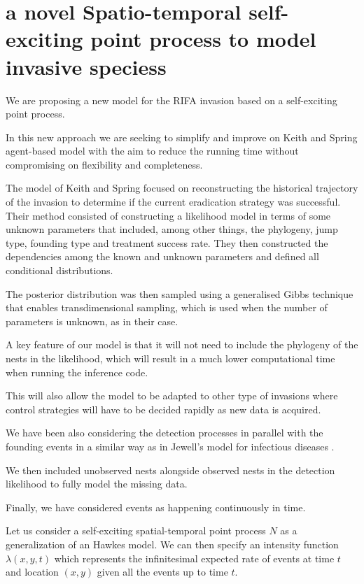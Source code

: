 \chapter[A novel Spatio-temporal self-exciting point process to model invasive species]{a novel Spatio-temporal self-exciting point process to model invasive speciess}
\label{ch:Model}

We are proposing a new model for the RIFA invasion based on a self-exciting point process.

In this new approach we are seeking to simplify and improve on Keith and Spring agent-based model \cite{Keith} with the aim to reduce the running time without compromising on flexibility and completeness.

The model of Keith and Spring focused on reconstructing the historical trajectory of the invasion to determine if the current eradication strategy was successful. Their method consisted of constructing a likelihood model in terms of some unknown parameters that included, among other things, the phylogeny, jump type, founding type and treatment success rate. They then constructed the dependencies among the known and unknown parameters and defined all conditional distributions.

The posterior distribution was then sampled using a generalised Gibbs technique that enables transdimensional sampling, which is used when the number of parameters is unknown, as in their case.

A key feature of our model is that it will not need to include the phylogeny of the nests in the likelihood, which will result in a much lower computational time when running the inference code.

This will also allow the model to be adapted to other type of invasions where control strategies will have to be decided rapidly as new data is acquired.

We have been also considering the detection processes in parallel with the founding events in a similar way as in Jewell's model for infectious diseases \cite{Jewell}.

We then included unobserved nests alongside observed nests in the detection likelihood to fully model the missing data.

Finally, we have considered events as happening continuously in time.

Let us consider a self-exciting spatial-temporal point process $N$ as a generalization of an Hawkes model. We can then specify an intensity function $\lambda(x, y, t)$ which represents the infinitesimal expected  rate of events at time $t$ and location $(x, y)$  given all the events up to time $t$.

